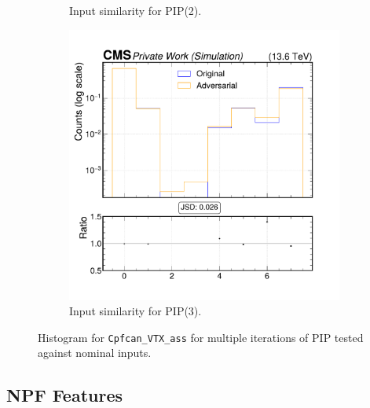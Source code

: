 \begin{figure}[h]
\begin{subfigure}[t]{0.32\textwidth}
    \caption{Input similarity for PIP(2).}
  \end{subfigure}\hfill
  \begin{subfigure}[t]{0.32\textwidth}
    \includegraphics[width=\linewidth]{media/output/features/compare/intprob_3/cmp_cpf_arr_Cpfcan_VTX_ass.pdf}
    \caption{Input similarity for PIP(3).}
  \end{subfigure}

  \caption{Histogram for \texttt{Cpfcan\_VTX\_ass} for multiple iterations of PIP tested against nominal inputs.}
  \label{fig:intprob_input_Cpfcan_VTX_ass}
\end{figure}

\newpage
\subsection*{NPF Features}

